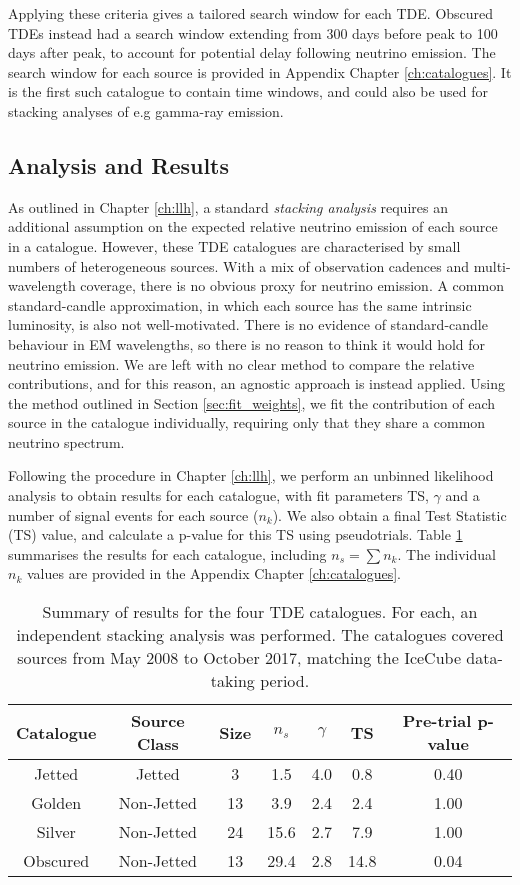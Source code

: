Applying these criteria gives a tailored search window for each TDE. Obscured TDEs instead had a search window extending from 300 days before peak to 100 days after peak, to account for potential delay following neutrino emission. The search window for each source is provided in Appendix Chapter \ref{ch:catalogues}. It is the first such catalogue to contain time windows, and could also be used for stacking analyses of e.g gamma-ray emission.

\subsection*{Analysis and Results}

As outlined in Chapter \ref{ch:llh}, a standard \emph{stacking analysis} requires an additional assumption on the expected relative neutrino emission of each source in a catalogue. However, these TDE catalogues are characterised by small numbers of heterogeneous sources. With a mix of observation cadences and multi-wavelength coverage, there is no obvious proxy for neutrino emission. A common standard-candle approximation, in which each source has the same intrinsic luminosity, is also not well-motivated. There is no evidence of standard-candle behaviour in EM wavelengths, so there is no reason to think it would hold for neutrino emission. We are left with no clear method to compare the relative contributions, and for this reason, an agnostic approach is instead applied. Using the method outlined in Section \ref{sec:fit_weights}, we fit the contribution of each source in the catalogue individually, requiring only that they share a common neutrino spectrum.

Following the procedure in Chapter \ref{ch:llh}, we perform an unbinned likelihood analysis to obtain results for each catalogue, with fit parameters TS, $\gamma$ and a number of signal events for each source ($n_{k}$). We also obtain a final Test Statistic (TS) value, and calculate a p-value for this TS using pseudotrials. Table \ref{tab:stacking_tests} summarises the results for each catalogue, including $n_{s} = \sum n_{k}$. The individual $n_{k}$ values are provided in the Appendix Chapter \ref{ch:catalogues}.

\begin{table}[]
	\centering
	\begin{tabular}{||c c c| c c c | c||} 
		\hline
		Catalogue & Source Class & Size & $n_{s}$  & $\gamma$ & TS & Pre-trial p-value\\
		\hline\hline
		Jetted & Jetted &  3 & 1.5& 4.0&0.8&0.40\\ 
		\hline
		Golden & Non-Jetted & 13 &3.9&2.4& 2.4&1.00\\
		\hline
		Silver & Non-Jetted & 24 &15.6&2.7&7.9 & 1.00\\
		\hline
		Obscured & Non-Jetted & 13 &29.4&2.8&14.8& 0.04\\[1ex] 
		\hline
	\end{tabular}
	\caption{Summary of results for the four TDE catalogues. For each, an independent stacking analysis was performed. The catalogues covered sources from May 2008 to October 2017, matching the IceCube data-taking period.}
	\label{tab:stacking_tests}
\end{table}{}

